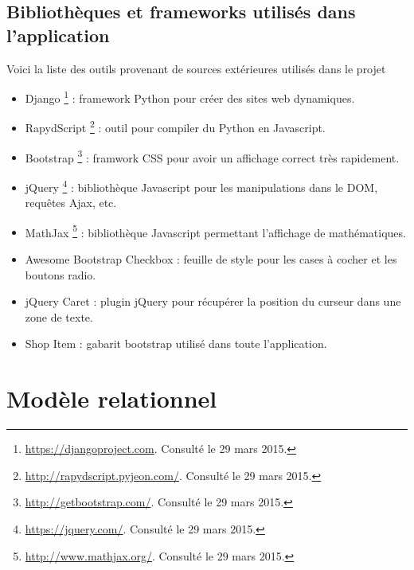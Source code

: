 \documentclass[a4paper,11pt,openany,oneside]{sphinxmanual}
\begin{document}
\section{Bibliothèques et frameworks utilisés dans l'application}
\label{global:bibliotheques-et-frameworks-utilises-dans-l-application}
Voici la liste des outils provenant de sources extérieures utilisés dans le projet
\begin{itemize}
\item {} 
Django \footnote{
\href{https://djangoproject.com}{https://djangoproject.com}. Consulté le 29 mars 2015.
} : framework Python pour créer des sites web dynamiques.

\item {} 
RapydScript \footnote{
\href{http://rapydscript.pyjeon.com/}{http://rapydscript.pyjeon.com/}. Consulté le 29 mars 2015.
} : outil pour compiler du Python en Javascript.

\item {} 
Bootstrap \footnote{
\href{http://getbootstrap.com/}{http://getbootstrap.com/}. Consulté le 29 mars 2015.
} : framwork CSS pour avoir un affichage correct très rapidement.

\item {} 
jQuery \footnote{
\href{https://jquery.com/}{https://jquery.com/}. Consulté le 29 mars 2015.
} : bibliothèque Javascript pour les manipulations dans le DOM, requêtes Ajax, etc.

\item {} 
MathJax \footnote{
\href{http://www.mathjax.org/}{http://www.mathjax.org/}. Consulté le 29 mars 2015.
} : bibliothèque Javascript permettant l'affichage de mathématiques.

\item {} 
Awesome Bootstrap Checkbox \footnotemark[9] : feuille de style pour les cases à cocher et les boutons radio.

\item {} 
jQuery Caret \footnotemark[11] : plugin jQuery pour récupérer la position du curseur dans une zone de texte.

\item {} 
Shop Item \footnotemark[10] : gabarit bootstrap utilisé dans toute l'application.

\end{itemize}


\chapter{Modèle relationnel}
\label{database::doc}\label{database:modele-relationnel}
\end{document}
